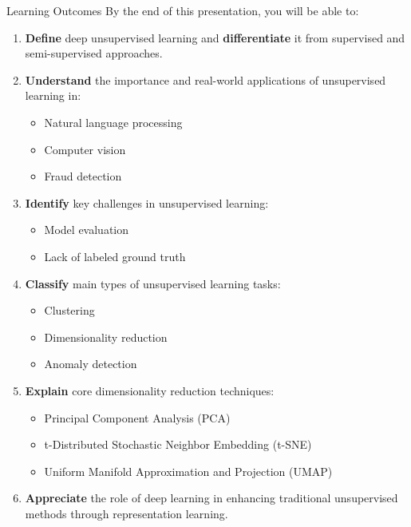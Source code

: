 \begin{frame}[allowframebreaks]{Learning Outcomes}
    By the end of this presentation, you will be able to:
    \begin{enumerate}
        \item \textbf{Define} deep unsupervised learning and \textbf{differentiate} it from supervised and semi-supervised approaches.
        \item \textbf{Understand} the importance and real-world applications of unsupervised learning in:
        \begin{itemize}
            \item Natural language processing
            \item Computer vision
            \item Fraud detection
        \end{itemize}
        \item \textbf{Identify} key challenges in unsupervised learning:
        \begin{itemize}
            \item Model evaluation
            \item Lack of labeled ground truth
        \end{itemize}

        \framebreak

        \item \textbf{Classify} main types of unsupervised learning tasks:
        \begin{itemize}
            \item Clustering
            \item Dimensionality reduction
            \item Anomaly detection
        \end{itemize}
        \item \textbf{Explain} core dimensionality reduction techniques:
        \begin{itemize}
            \item Principal Component Analysis (PCA)
            \item t-Distributed Stochastic Neighbor Embedding (t-SNE)
            \item Uniform Manifold Approximation and Projection (UMAP)
        \end{itemize}
        \item \textbf{Appreciate} the role of deep learning in enhancing traditional unsupervised methods through representation learning.
    \end{enumerate}
\end{frame}